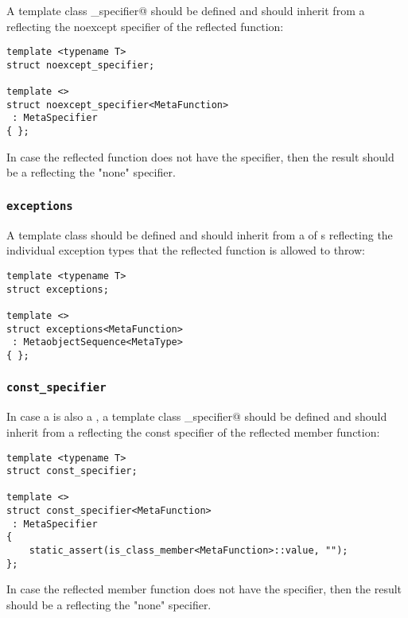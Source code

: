 A template class \verb@noexcept_specifier@ should be defined and should inherit from
a  reflecting the noexcept specifier of the reflected function:

\begin{verbatim}
template <typename T>
struct noexcept_specifier;

template <>
struct noexcept_specifier<MetaFunction>
 : MetaSpecifier
{ };
\end{verbatim}

In case the reflected function does not have the \verb@noexcept@ specifier,
then the result should be a  reflecting the "none" specifier.

\subsubsection{\texttt{exceptions}}

A template class \verb@exceptions@ should be defined and should inherit from
a  of s reflecting the individual exception types
that the reflected function is allowed to throw:

\begin{verbatim}
template <typename T>
struct exceptions;

template <>
struct exceptions<MetaFunction>
 : MetaobjectSequence<MetaType>
{ };
\end{verbatim}

\subsubsection{\texttt{const\_specifier}}

In case a  is also a ,
a template class \verb@const_specifier@ should be defined and should inherit from
a  reflecting the const specifier of the reflected member function:

\begin{verbatim}
template <typename T>
struct const_specifier;

template <>
struct const_specifier<MetaFunction>
 : MetaSpecifier
{
	static_assert(is_class_member<MetaFunction>::value, "");
};
\end{verbatim}

In case the reflected member function does not have the \verb@const@ specifier,
then the result should be a  reflecting the "none" specifier.

